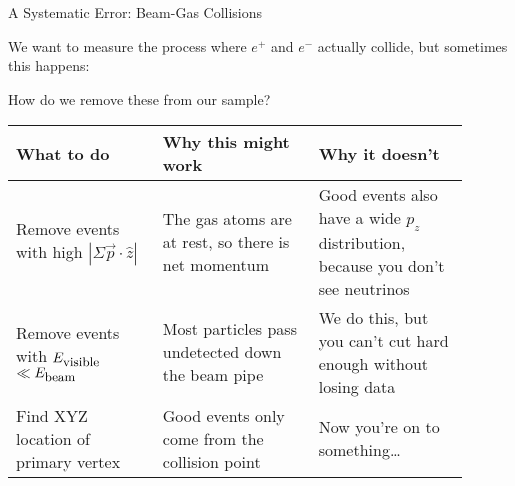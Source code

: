 \begin{slide*}
\slideframe{}
\begin{minipage}[t]{\linewidth}
\Large \black

{\huge A Systematic Error: Beam-Gas Collisions}

\vspace{0.25cm}

We want to measure the process where $e^+$ and $e^-$ actually collide,
but sometimes this happens:

\vspace{0.25cm}

\begin{center}
\end{center}

\vspace{0.5cm}

How do we remove these from our sample?

\vspace{0.5cm}

\begin{center}
  \begin{tabular}{p{0.29\linewidth} | p{0.31\linewidth} | p{0.3\linewidth} }
    What to do & Why this might work & Why it doesn't \\\hline

    Remove events with high $\left| \Sigma \vec{p} \cdot \hat{z} \right|$ &
      The gas atoms are at rest, so there is net momentum &
      Good events also have a wide $p_z$ distribution, because you
      don't see neutrinos \\

    Remove events with \mbox{$E_{\mbox{\small visible}}$ $\ll
      E_{\mbox{\small beam}}$} &
      Most particles pass undetected down the beam pipe &
      We do this, but you can't cut hard enough without losing data \\

    Find XYZ location of primary vertex &
      Good events only come from the collision point &
      Now you're on to something\ldots \\

  \end{tabular}
\end{center}

\end{minipage}
\end{slide*}


